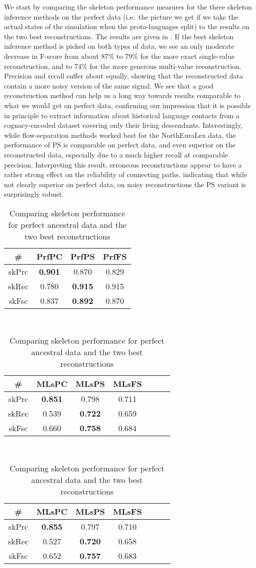 We start by comparing the skeleton performance measures for the three skeleton inference methods on the perfect data (i.e.\ the picture we get if we take the actual states of the simulation when the proto-languages split) to the results on the two best reconstructions. The results are given in . If the best skeleton inference method is picked on both types of data, we see an only moderate decrease in F-score from about 87\% to 79\% for the more exact single-value reconstruction, and to 74\% for the more generous multi-value reconstruction. Precision and recall suffer about equally, showing that the reconstructed data contain a more noisy version of the same signal. We see that a good reconstruction method can help us a long way towards results comparable to what we would get on perfect data, confirming our impression that it is possible in principle to extract information about historical language contacts from a cognacy-encoded dataset covering only their living descendants. Interestingly, while flow-separation methods worked best for the NorthEuraLex data, the performance of PS is comparable on perfect data, and even superior on the reconstructed data, especially due to a much higher recall at comparable precision. Interpreting this result, erroneous reconstructions appear to have a rather strong effect on the reliability of connecting paths, indicating that while not clearly superior on perfect data, on noisy reconstructions the PS variant is surprisingly robust.

\begin{table}[t]
 \centering
  \begin{tabular}{cccc}
  \hline \hline
  \# & PrfPC & PrfPS & PrfFS\\ \hline
  skPrc & \textbf{0.901} & 0.870 & 0.829\\
  skRec & 0.780 & \textbf{0.915} & 0.915\\
  skFsc & 0.837 & \textbf{0.892} & 0.870\\
  \hline
 \end{tabular}\\[0.5cm]
 \begin{tabular}{ccccccc}
  \hline \hline
  \# & MLsPC & MLsPS & MLsFS\\ \hline
  skPrc & \textbf{0.851} & 0.798 & 0.711\\
  skRec & 0.539 & \textbf{0.722} & 0.659\\
  skFsc & 0.660 & \textbf{0.758} & 0.684\\
  \hline
 \end{tabular}\\[0.5cm]
\begin{tabular}{ccccccc}
  \hline \hline
  \# & MLsPC & MLsPS & MLsFS\\ \hline
  skPrc & \textbf{0.855} & 0.797 & 0.710\\
  skRec & 0.527 & \textbf{0.720} & 0.658\\
  skFsc & 0.652 & \textbf{0.757} & 0.683\\
  \hline
 \end{tabular}
 \caption{Comparing skeleton performance for perfect ancestral data and the two best reconstructions}
 \label{perfect-vs-reconstruction-skeleton}
\end{table}


